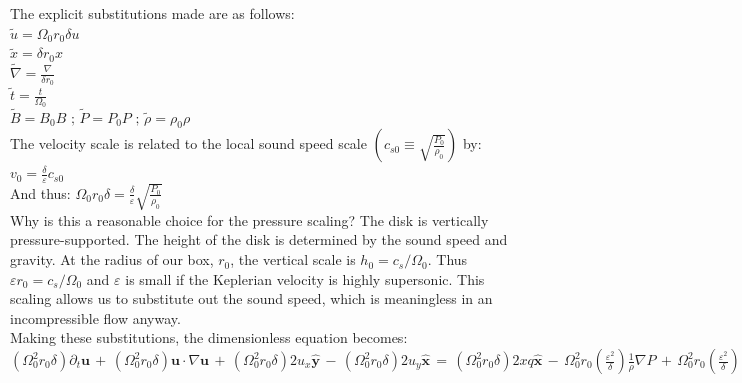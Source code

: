 \documentclass[letterpaper,12pt]{article}
\begin{document}
The explicit substitutions made are as follows: \\

$\widetilde{u} = \Omega_0 r_0 \delta u$ \\

$\widetilde{x} = \delta r_0 x$ \\

$\widetilde{\nabla} = \frac{\nabla}{\delta r_0}$ \\

$\widetilde{t} = \frac{t}{\Omega_0}$ \\ 

$\widetilde{B} = B_0 B \, \,; \,  \widetilde{P} = P_0 P \, \, ; \, \widetilde{\rho} = \rho_0 \rho $ \\

The velocity scale is related to the local sound speed scale $\left(c_{s0} \equiv \sqrt{\frac{P_0}{\rho_0}}\right)$ by:\\

$v_0 = \frac{\delta}{\varepsilon} c_{s0}$ \\

And thus: $\Omega_0 r_0 \delta = \frac{\delta}{\varepsilon} \sqrt{\frac{P_0}{\rho_0}}$ \\

Why is this a reasonable choice for the pressure scaling? The disk is vertically pressure-supported. The height of the disk is determined by the sound speed and gravity. At the radius of our box, $r_0$, the vertical scale is $h_0 = c_s/\Omega_0$. Thus $\varepsilon r_0 = c_s/\Omega_0$ and $\varepsilon$ is small if the Keplerian velocity is highly supersonic. This scaling allows us to substitute out the sound speed, which is meaningless in an incompressible flow anyway. \\

Making these substitutions, the dimensionless equation becomes: \\

$\left(\Omega_0^2 r_0 \delta\right) \partial_t \mathbf{u} \, + \, \left(\Omega_0^2 r_0 \delta\right)\mathbf{u} \cdot \nabla \mathbf{u} \,+\, \left(\Omega_0^2 r_0 \delta\right) 2 u_x \mathbf{\hat{y}} \,-\, \left(\Omega_0^2 r_0 \delta\right) 2 u_y \mathbf{\hat{x}} \, = \, \left(\Omega_0^2 r_0 \delta\right) 2 x q \mathbf{\hat{x}} \,-\, \Omega_0^2 r_0 \left(\frac{\varepsilon^2}{\delta}\right)\frac{1}{\rho} \nabla P  \,+\, \Omega_0^2 r_0 \left(\frac{\varepsilon^2}{\delta}\right)\frac{1}{\rho_b} \nabla P_b \, - \, \frac{\varepsilon^2 \Omega_0^2 r_0}{\beta \delta} \frac{1}{4 \pi \rho} \left( \nabla \times \mathbf{B} \right) \times \mathbf{B} \, + \, \nu\left(\frac{\Omega_0}{r_0 \delta}\right) \nabla^2 \mathbf{u}$ \\
\end{document}
